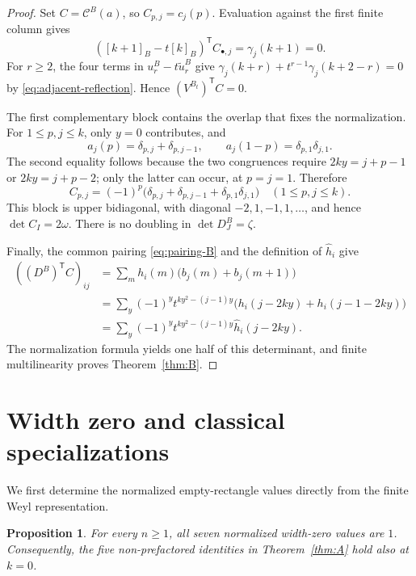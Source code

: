 \documentclass[12pt]{article}
\newtheorem{proposition}[theorem]{Proposition}
\numberwithin{equation}{section}
\begin{document}
\begin{proof}
Set $C=\mathcal C^B(a)$, so $C_{p,j}=c_j(p)$.
Evaluation against the first finite column gives
\[
 ([k+1]_B-t[k]_B)^{\mathsf T}C_{\bullet,j}
 =\gamma_j(k+1)=0.
\]
For $r\ge2$, the four terms in $u_r^B-t\widetilde u_r^B$ give
$\gamma_j(k+r)+t^{r-1}\gamma_j(k+2-r)=0$ by
\eqref{eq:adjacent-reflection}.  Hence
$(V^{B_t})^{\mathsf T}C=0$.

The first complementary block contains the overlap that fixes the
normalization.  For $1\le p,j\le k$, only $y=0$ contributes, and
\[
 a_j(p)=\delta_{p,j}+\delta_{p,j-1},\qquad
 a_j(1-p)=\delta_{p,1}\delta_{j,1}.
\]
The second equality follows because the two congruences require
$2ky=j+p-1$ or $2ky=j+p-2$; only the latter can occur, at $p=j=1$.
Therefore
\[
 C_{p,j}=(-1)^p\bigl(\delta_{p,j}+\delta_{p,j-1}
                         +\delta_{p,1}\delta_{j,1}\bigr)
 \quad(1\le p,j\le k).
\]
This block is upper bidiagonal, with diagonal $-2,1,-1,1,\ldots$,
and hence $\det C_I=2\omega$.  There is no doubling in
$\det D^B_J=\zeta$.

Finally, the common pairing \eqref{eq:pairing-B} and the definition of
$\widehat h_i$ give
\begin{align*}
 ((D^B)^{\mathsf T}C)_{ij}
 &=\sum_m h_i(m)\bigl(b_j(m)+b_j(m+1)\bigr)\\
 &=\sum_y(-1)^yt^{ky^2-(j-1)y}
          \bigl(h_i(j-2ky)+h_i(j-1-2ky)\bigr)\\
 &=\sum_y(-1)^yt^{ky^2-(j-1)y}\widehat h_i(j-2ky).
\end{align*}
The normalization formula yields one half of this determinant, and
finite multilinearity proves Theorem~\ref{thm:B}.
\end{proof}


\section{Width zero and classical specializations}\label{sec:boundary}

We first determine the normalized empty-rectangle values directly
from the finite Weyl representation.

\begin{proposition}
For every $n\ge1$, all seven normalized width-zero values are $1$.
Consequently, the five non-prefactored identities in
Theorem~\ref{thm:A} hold also at $k=0$.
\end{proposition}
\end{document}
